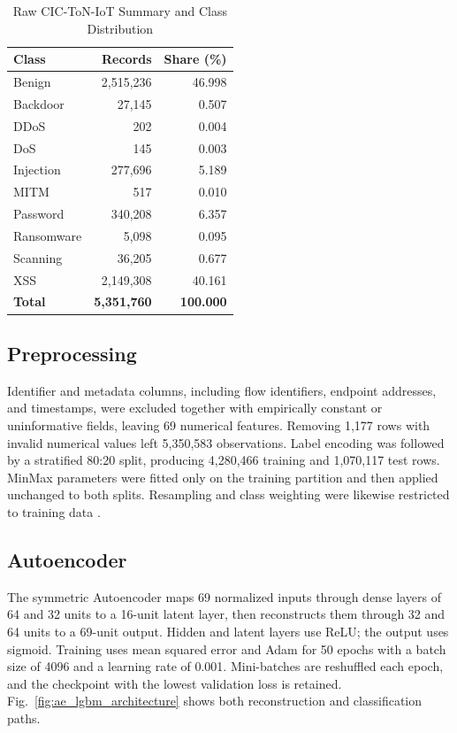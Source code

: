 \documentclass[conference]{IEEEtran}
\begin{document}
\begin{table}[t]
\caption{Raw CIC-ToN-IoT Summary and Class Distribution}
\label{tab:dataset_distribution}
\centering
\footnotesize
\setlength{\tabcolsep}{4pt}
\renewcommand{\arraystretch}{0.92}
\begin{tabular}{@{}lrr@{}}
\toprule
\textbf{Class} & \textbf{Records} & \textbf{Share (\%)} \\
\midrule
Benign     & 2,515,236 & 46.998 \\
Backdoor   &    27,145 &  0.507 \\
DDoS       &       202 &  0.004 \\
DoS        &       145 &  0.003 \\
Injection  &   277,696 &  5.189 \\
MITM       &       517 &  0.010 \\
Password   &   340,208 &  6.357 \\
Ransomware &     5,098 &  0.095 \\
Scanning   &    36,205 &  0.677 \\
XSS        & 2,149,308 & 40.161 \\
\midrule
\textbf{Total} & \textbf{5,351,760} & \textbf{100.000} \\
\bottomrule
\end{tabular}
\end{table}

\subsection{Preprocessing}
Identifier and metadata columns, including flow identifiers, endpoint addresses, and timestamps, were excluded together with empirically constant or uninformative fields, leaving 69 numerical features. Removing 1,177 rows with invalid numerical values left 5,350,583 observations. Label encoding was followed by a stratified 80:20 split, producing 4,280,466 training and 1,070,117 test rows. MinMax parameters were fitted only on the training partition and then applied unchanged to both splits. Resampling and class weighting were likewise restricted to training data \cite{Bouke2023,Manocchio2025}.

\subsection{Autoencoder}
The symmetric Autoencoder maps 69 normalized inputs through dense layers of 64 and 32 units to a 16-unit latent layer, then reconstructs them through 32 and 64 units to a 69-unit output. Hidden and latent layers use ReLU; the output uses sigmoid. Training uses mean squared error and Adam for 50 epochs with a batch size of 4096 and a learning rate of 0.001. Mini-batches are reshuffled each epoch, and the checkpoint with the lowest validation loss is retained. Fig.~\ref{fig:ae_lgbm_architecture} shows both reconstruction and classification paths.
\end{document}
